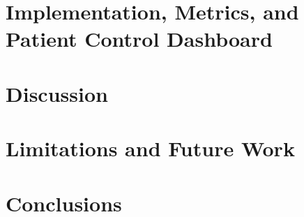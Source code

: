 \documentclass[11pt,letterpaper]{article}
\begin{document}
\section{Implementation, Metrics, and Patient Control Dashboard}
\label{sec:implementation-metrics}

\newpage

\section{Discussion}
\label{sec:discussion}

\newpage

\section{Limitations and Future Work}
\label{sec:limitations}

\newpage

\section{Conclusions}
\label{sec:conclusions}

\newpage

\begingroup
\raggedright
\printbibliography[title={References}]
\endgroup
{}
\newpage


\end{document}
